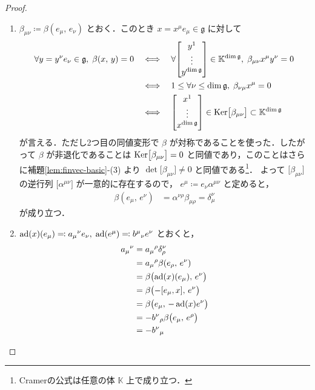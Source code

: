 \documentclass[rep_main]{subfiles}
\begin{document}
\begin{proof}
	\begin{enumerate}
		\item 
		$\beta_{\mu\nu} \coloneqq \beta(e_\mu,\, e_\nu)$ とおく．このとき $x = x^\mu e_\mu \in \mathfrak{g}$ に対して
		\begin{align}
			\forall y = y^\nu e_\nu \in \mathfrak{g},\; \beta(x,\, y) = 0 
			&\IFF \forall \mqty[y^1 \\ \vdots \\ y^{\dim \mathfrak{g}}] \in \mathbb{K}^{\dim \mathfrak{g}},\; \beta_{\mu\nu} x^\mu y^\nu = 0 \\
			&\IFF 1 \le \forall \nu \le \dim \mathfrak{g},\; \beta_{\nu\mu} x^\mu = 0 \\
			&\IFF \mqty[x^1 \\ \vdots \\ x^{\dim \mathfrak{g}}] \in \Ker \bigl[ \beta_{\mu\nu} \bigr] \subset \mathbb{K}^{\dim \mathfrak{g}}
		\end{align}
		が言える．ただし2つ目の同値変形で $\beta$ が対称であることを使った．したがって $\beta$ が非退化であることは $\operatorname{Ker} \bigl[ \beta_{\mu\nu} \bigr] = 0$ と同値であり，このことはさらに補題\ref{lem:finvec-basic}-(3) より $\det \bigl[ \beta_{\mu\nu} \bigr] \neq 0$ と同値である\footnote{Cramerの公式は任意の体 $\mathbb{K}$ 上で成り立つ．}．
		よって $\bigl[ \beta_{\mu\nu} \bigr]$ の逆行列 $\bigl[ \alpha^{\mu\nu} \bigr]$ が一意的に存在するので，
		$e^\mu \coloneqq e_\nu \alpha^{\mu\nu}$ と定めると，
		\begin{align}
			\beta(e_\mu,\, e^\nu) 
			&= \alpha^{\nu\rho} \beta_{\mu\rho} = \delta_{\mu}^{\nu}
		\end{align}
		が成り立つ．
		\item $\operatorname{ad}(x)(e_\mu) \eqqcolon a_\mu{}^\nu e_\nu,\; \operatorname{ad}(e^\mu) \eqqcolon b^{\mu}{}_\nu e^\nu$ とおくと，
		\begin{align}
			a_\mu{}^\nu 
			&= a_\mu{}^\rho \delta_{\rho}^{\nu} \\
			&= a_\mu{}^\rho \beta(e_\rho,\, e^\nu) \\
			&= \beta \bigl(\ad(x)(e_\mu),\, e^\nu\bigr) \\
			&= \beta \bigl(-\comm{e_\mu}{x},\, e^\nu\bigr) \\
			&= \beta \bigl(e_\mu,\, - \ad(x){e^\nu}\bigr) \\
			&= -b^\nu{}_\rho \beta \bigl(e_\mu,\, e^\rho\bigr) \\
			&= -b^\nu{}_\mu
		\end{align}
	\end{enumerate}
	
\end{proof}
\end{document}
